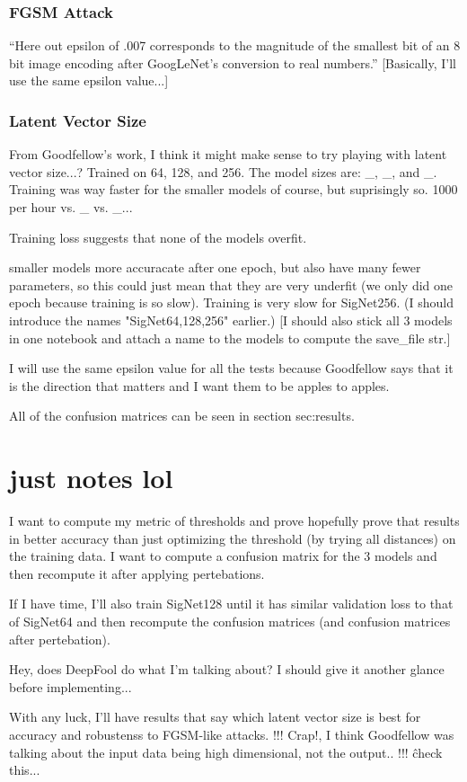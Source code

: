 \subsubsection{FGSM Attack}
``Here out epsilon of .007 corresponds to the magnitude of the
smallest bit of an 8 bit image encoding after GoogLeNet's conversion to real numbers.''\cite{goodfellow}
[Basically, I'll use the same epsilon value...]

\subsubsection{Latent Vector Size}
From Goodfellow's work, I think it might make sense to try playing with latent vector size...?
Trained on 64, 128, and 256.
The model sizes are: \_, \_, and \_.
Training was way faster for the smaller models of course, but suprisingly so.
1000 per hour vs. \_ vs. \_...

Training loss suggests that none of the models overfit.

smaller models more accuracate after one epoch, but also have many fewer parameters, so this could just mean that they are very underfit (we only did one epoch because training is so slow).
Training is very slow for SigNet256.
(I should introduce the names "SigNet64,128,256" earlier.)
[I should also stick all 3 models in one notebook and attach a name to the models to compute the save\_file str.]

I will use the same epsilon value for all the tests because Goodfellow says that it is the direction that matters and I want them to be apples to apples.

All of the confusion matrices can be seen in section {sec:results}.



\section{just notes lol}
I want to compute my metric of thresholds and prove hopefully prove that results in better accuracy than just optimizing the threshold (by trying all distances) on the training data.
I want to compute a confusion matrix for the 3 models and then recompute it after applying pertebations.

If I have time, I'll also train SigNet128 until it has similar validation loss to that of SigNet64 and then recompute the confusion matrices (and confusion matrices after pertebation).

Hey, does DeepFool do what I'm talking about?
    I should give it another glance before implementing...

With any luck, I'll have results that say which latent vector size is best for accuracy and robustenss to FGSM-like attacks.
!!! Crap!, I think Goodfellow was talking about the input data being high dimensional, not the output.. !!!
    \^check this...
